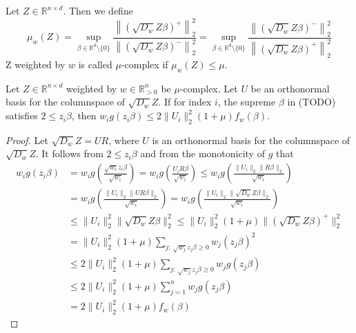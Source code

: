 \begin{definition}
    Let $Z \in \mathbb{R}^{n \times d}$. Then we define
    $$
        \mu_w(Z) = \sup_{\beta \in \mathbb{R}^d \setminus \{0\}}
        \frac{\left \lVert (\sqrt{D_w} Z \beta)^+ \right \rVert_2^2}
        {\left \lVert (\sqrt{D_w} Z \beta)^- \right \rVert_2^2}
        =
        \sup_{\beta \in \mathbb{R}^d \setminus \{0\}}
        \frac{\left \lVert (\sqrt{D_w} Z \beta)^- \right \rVert_2^2}
        {\left \lVert (\sqrt{D_w} Z \beta)^+ \right \rVert_2^2}
    $$
    Z weighted by $w$ is called $\mu$-complex if $\mu_w(Z) \leq \mu$.
\end{definition}

\begin{lemma}
    Let $Z \in \mathbb{R}^{n \times d}$ weighted by $w \in \mathbb{R}^n_{>0}$
    be $\mu$-complex. Let $U$ be an orthonormal basis for the columnspace
    of $\sqrt{D_w} Z$. If for index $i$, the supreme $\beta$ in (TODO) satisfies
    $2 \leq z_i \beta$, then
    $w_i g(z_i \beta) \leq 2 \lVert U_i \rVert_2^2 (1 + \mu) f_w(\beta)$.
\end{lemma}
\begin{proof}
    Let $\sqrt{D_w} Z = UR$, where $U$ is an orthonormal basis for the columnspace
    of $\sqrt{D_w} Z$. It follows from $2 \leq z_i \beta$ and from the monotonicity
    of $g$ that
    \begin{align*}
        w_i g(z_i \beta)
         & = w_i g\left(\frac{\sqrt{w_i} z_i \beta}{\sqrt{w_i}}\right)
        = w_i g\left(\frac{U_i R \beta}{\sqrt{w_i}}\right)
        \leq w_i g\left(\frac{\lVert U_i \rVert_2 \lVert R \beta \rVert_2}{\sqrt{w_i}}\right)               \\
         & = w_i g\left(\frac{\lVert U_i \rVert_2 \lVert U R \beta \rVert_2}{\sqrt{w_i}}\right)
        = w_i g\left(\frac{\lVert U_i \rVert_2 \lVert \sqrt{D_w} Z \beta \rVert_2}{\sqrt{w_i}}\right)       \\
         & \leq \lVert U_i \rVert_2^2 \lVert \sqrt{D_w} Z \beta \rVert_2^2
        \leq \lVert U_i \rVert_2^2 (1 + \mu) \lVert (\sqrt{D_w} Z \beta)^+ \rVert_2^2                       \\
         & = \lVert U_i \rVert_2^2 (1 + \mu) \sum_{j: \  \sqrt{w_j} z_j \beta \geq 0} w_j (z_j \beta)^2     \\
         & \leq 2 \lVert U_i \rVert_2^2 (1 + \mu) \sum_{j: \  \sqrt{w_j} z_j \beta \geq 0} w_j g(z_j \beta) \\
         & \leq 2 \lVert U_i \rVert_2^2 (1 + \mu) \sum_{j = 1}^n w_j g(z_j \beta)                           \\
         & = 2 \lVert U_i \rVert_2^2 (1 + \mu) f_w(\beta)
    \end{align*}
\end{proof}


